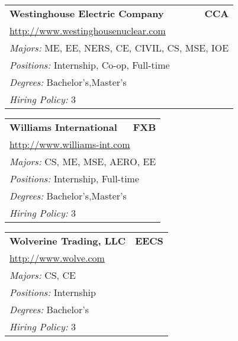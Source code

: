 \documentclass[twoside]{article}
\begin{document}
\begin{center}
\begin{multicols}{3}
\begin{FlushLeft}
\begin{minipage}{.9\columnwidth}
\end{minipage}
 
\begin{minipage}{.9\columnwidth}\begin{tabularx}{.95\columnwidth}{Xr}
                 {\Large\bf Westinghouse Electric Company} & {\Large\bf CCA}\\
    \multicolumn{2}{p{.95\columnwidth}}{\url{http://www.westinghousenuclear.com}}\\
    \multicolumn{2}{p{.95\columnwidth}}{\emph{Majors:} ME, EE, NERS, CE, CIVIL, CS, MSE, IOE}\\
    \multicolumn{2}{p{.95\columnwidth}}{\emph{Positions:} Internship, Co-op, Full-time}\\
    \multicolumn{2}{p{.95\columnwidth}}{\emph{Degrees:} Bachelor's,Master's}\\
    \multicolumn{2}{p{.95\columnwidth}}{\emph{Hiring Policy:} 3}\\
    \end{tabularx}
    
\end{minipage}
 
\begin{minipage}{.9\columnwidth}\begin{tabularx}{.95\columnwidth}{Xr}
                 {\Large\bf Williams International} & {\Large\bf FXB}\\
    \multicolumn{2}{p{.95\columnwidth}}{\url{http://www.williams-int.com}}\\
    \multicolumn{2}{p{.95\columnwidth}}{\emph{Majors:} CS, ME, MSE, AERO, EE}\\
    \multicolumn{2}{p{.95\columnwidth}}{\emph{Positions:} Internship, Full-time}\\
    \multicolumn{2}{p{.95\columnwidth}}{\emph{Degrees:} Bachelor's,Master's}\\
    \multicolumn{2}{p{.95\columnwidth}}{\emph{Hiring Policy:} 3}\\
    \end{tabularx}
    
\end{minipage}
 
\begin{minipage}{.9\columnwidth}\begin{tabularx}{.95\columnwidth}{Xr}
                 {\Large\bf Wolverine Trading, LLC} & {\Large\bf EECS}\\
    \multicolumn{2}{p{.95\columnwidth}}{\url{http://www.wolve.com}}\\
    \multicolumn{2}{p{.95\columnwidth}}{\emph{Majors:} CS, CE}\\
    \multicolumn{2}{p{.95\columnwidth}}{\emph{Positions:} Internship}\\
    \multicolumn{2}{p{.95\columnwidth}}{\emph{Degrees:} Bachelor's}\\
    \multicolumn{2}{p{.95\columnwidth}}{\emph{Hiring Policy:} 3}\\
    \end{tabularx}
    

\end{minipage}
\end{FlushLeft}
\end{multicols}
\end{center}
\end{document}
